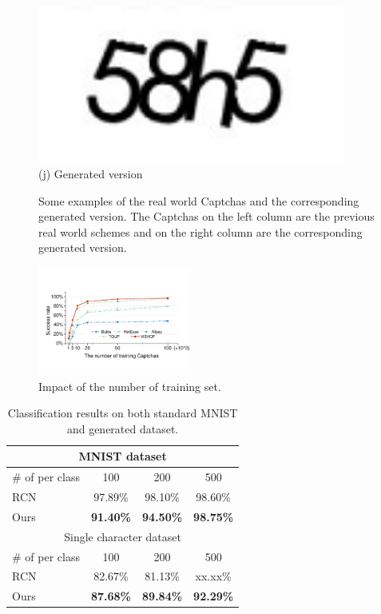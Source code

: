 \begin{figure}
{\begin{minipage}[t]{0.2\textwidth}
        \includegraphics[width=0.9\textwidth]{fig/generate_captchas/baidu_generator.png}\\
        \center (j) Generated version
    \end{minipage}
    }
  \caption{Some examples of the real world Captchas and the corresponding generated version. The Captchas on the left column are the previous real world schemes and on the right column are the corresponding generated version.}
  \label{fig: generate_show}
\end{figure}

\begin{figure}
  \centering
  \includegraphics[width=0.45\textwidth]{fig/training_set.pdf}
  \caption{Impact of the number of training set.}
  \label{fig: training_set}
\end{figure}

\begin{table}[t]
    \centering
    \caption{Classification results on both standard MNIST and generated dataset.}
    \label{table: mnist}
    \begin{tabular}{lccc}
        \toprule
        \multicolumn{4}{c}{MNIST dataset} \\
        \midrule
        \# of per class & 100  & 200 & 500\\
        \midrule
        RCN & 97.89\% & 98.10\% & 98.60\% \\
        Ours & \textbf{91.40\%} & \textbf{94.50\%} & \textbf{98.75\%} \\
        \toprule
        \multicolumn{4}{c}{Single character dataset} \\
        \midrule
        \# of per class & 100  & 200 & 500\\
        \midrule
        RCN & 82.67\% & 81.13\% & xx.xx\% \\
        Ours & \textbf{87.68\%} & \textbf{89.84\%} & \textbf{92.29\%} \\
        \bottomrule
    \end{tabular}
\end{table}

